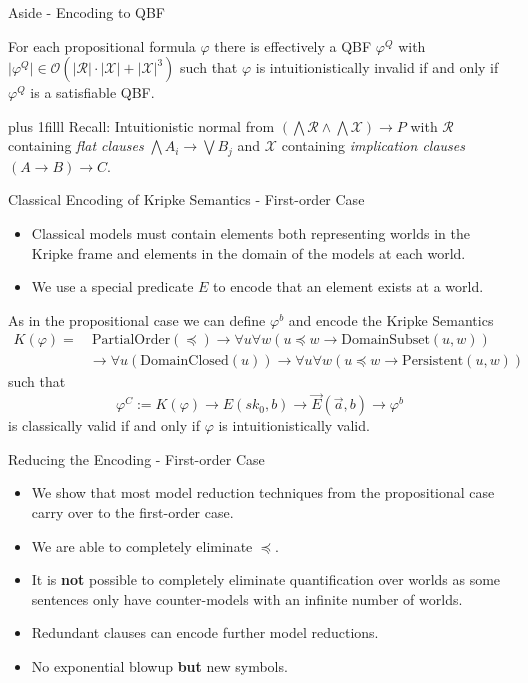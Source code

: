 \documentclass{cubeamer}
\newcommand{\btVFill}{\vskip0pt plus 1filll}
\begin{document}
	\begin{frame}{Aside - Encoding to QBF}
		\vspace*{2cm}
				
		\begin{lemma}
			For each propositional formula $\varphi$ there is effectively a QBF $\varphi^Q$ with $\mathcal |\varphi^Q|\in\mathcal O(|\mathcal R|\cdot|\mathcal X| + |\mathcal X|^3)$ such that $\varphi$ is intuitionistically invalid if and only if $\varphi^Q$ is a satisfiable QBF.
		\end{lemma}
		\btVFill
		Recall: Intuitionistic normal from $\left(\bigwedge\mathcal R\wedge\bigwedge\mathcal X\right)\to P$ with $\mathcal R$ containing  \emph{flat clauses} $\bigwedge A_i\to \bigvee B_j$ and $\mathcal X$ containing \emph{implication clauses} $(A\to B)\to C$.
	\end{frame}

	\begin{frame}{Classical Encoding of Kripke Semantics - First-order Case}
		\begin{itemize}
			\item Classical models must contain elements both representing worlds in the Kripke frame and elements in the domain of the models at each world.
			\item 
			We use a special predicate $E$ to encode that an element exists at a world.
		\end{itemize}
		As in the propositional case we can define $\varphi^b$ and encode the Kripke Semantics
		\begin{align*}
			K(\varphi)= &\:\text{PartialOrder}(\preceq) \to \forall u \forall w (u\preceq w\to \text{DomainSubset}(u, w))\\
			&\to\forall u(\text{DomainClosed}(u))\to \forall u\forall w (u\preceq w\to \text{Persistent}(u, w))
		\end{align*}
		such that
		\[\varphi^C:= K(\varphi)\to E(sk_0, b)\to \vec E(\vec a, b)\to \varphi^b\]
		is classically valid if and only if $\varphi$ is intuitionistically valid.
	\end{frame}
	
	\begin{frame}{Reducing the Encoding - First-order Case}
		\begin{itemize}
			\item We show that most model reduction techniques from the propositional case carry over to the first-order case.
			\item We are able to completely eliminate $\preceq$.
			\item It is \textbf{not} possible to completely eliminate quantification over worlds as some sentences only have counter-models with an infinite number of worlds.
			\item Redundant clauses can encode further model reductions.
			\item No exponential blowup \textbf{but} new symbols.
		\end{itemize}
	\end{frame}
\end{document}
